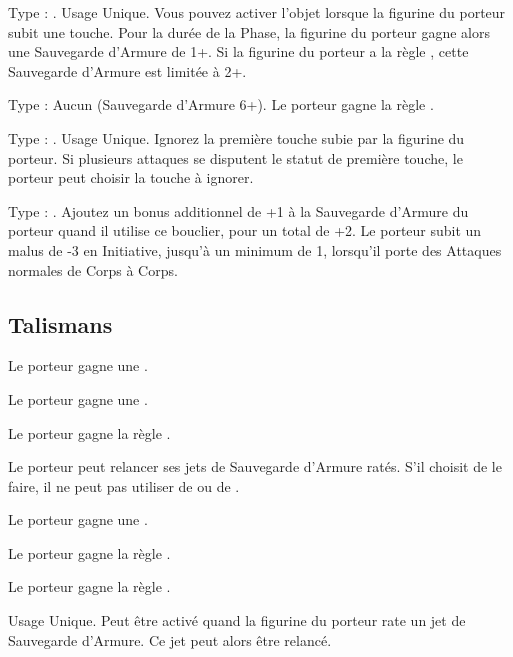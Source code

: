 \columnbreak

Type : \ha{}. Usage Unique. Vous pouvez activer l'objet lorsque la figurine du porteur subit une touche. Pour la durée de la Phase, la figurine du porteur gagne alors une Sauvegarde d'Armure de 1+. Si la figurine du porteur a la règle \toweringpresence{}, cette Sauvegarde d'Armure est limitée à 2+.

Type : Aucun (Sauvegarde d'Armure 6+). Le porteur gagne la règle \fireborn{}.

Type : \shield{}. Usage Unique. Ignorez la première touche subie par la figurine du porteur. Si plusieurs attaques se disputent le statut de première touche, le porteur peut choisir la touche à ignorer.

Type : \shield{}. Ajoutez un bonus additionnel de +1 à la Sauvegarde d'Armure du porteur quand il utilise ce bouclier, pour un total de +2. Le porteur subit un malus de -3 en Initiative, jusqu'à un minimum de 1, lorsqu'il porte des Attaques normales de Corps à Corps.

\endpricelist

\newpage
\hypertarget{talismans}{\subsection{Talismans}}
\label{talismans}

\startpricelist

Le porteur gagne une .

Le porteur gagne une .

Le porteur gagne la règle .

Le porteur peut relancer ses jets de Sauvegarde d'Armure ratés. S'il choisit de le faire, il ne peut pas utiliser de \wardsave{} ou de \regeneration{}.

Le porteur gagne une .

\columnbreak

Le porteur gagne la règle .

Le porteur gagne la règle \fireborn{}.

Usage Unique. Peut être activé quand la figurine du porteur rate un jet de Sauvegarde d'Armure. Ce jet peut alors être relancé.

